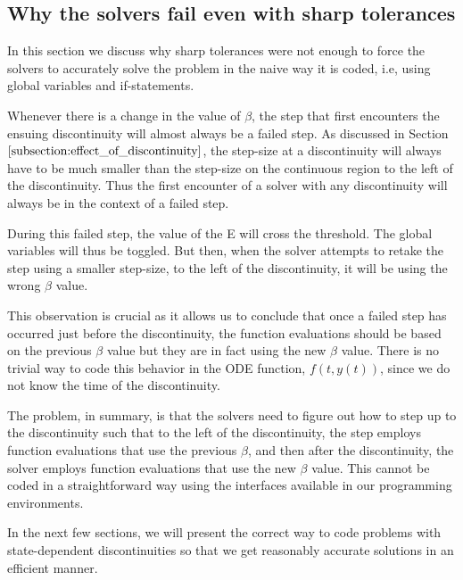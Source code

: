 \subsection{Why the solvers fail even with sharp tolerances}
\label{subsection:state_sharp_tol_failed}
In this section we discuss why sharp tolerances were not enough to force the solvers to accurately solve the problem in the naive way it is coded, i.e, using global variables and if-statements. 

Whenever there is a change in the value of $\beta$, the step that first encounters the ensuing discontinuity will almost always be a failed step. As discussed in Section $\ref{subsection:effect_of_discontinuity}$, the step-size at a discontinuity will always have to be much smaller than the step-size on the continuous region to the left of the discontinuity. Thus the first encounter of a solver with any discontinuity will always be in the context of a failed step.

During this failed step, the value of the E will cross the threshold. The global variables will thus be toggled. But then, when the solver attempts to retake the step using a smaller step-size, to the left of the discontinuity, it will be using the wrong $\beta$ value. 

This observation is crucial as it allows us to conclude that once a failed step has occurred just before the discontinuity, the function evaluations should be based on the previous $\beta$ value but they are in fact using the new $\beta$ value. There is no trivial way to code this behavior in the ODE function, $f(t, y(t))$, since we do not know the time of the discontinuity. 

The problem, in summary, is that the solvers need to figure out how to step up to the discontinuity such that to the left of the discontinuity, the step employs function evaluations that use the previous $\beta$, and then after the discontinuity, the solver employs function evaluations that use the new $\beta$ value. This cannot be coded in a straightforward way using the interfaces available in our programming environments.

In the next few sections, we will present the correct way to code problems with state-dependent discontinuities so that we get reasonably accurate solutions in an efficient manner.

